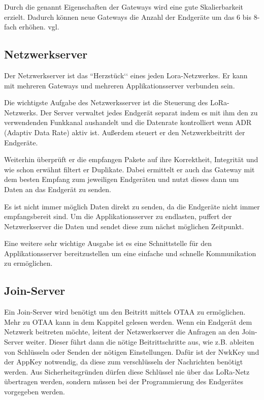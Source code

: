 \documentclass[a4paper,12pt]{article}
\begin{document}
            Durch die genannt Eigenschaften der Gateways wird eine gute Skalierbarkeit erzielt. Dadurch können neue 
            Gateways die Anzahl der Endgeräte um das 6 bis 8-fach erhöhen. vgl. \cite[S.10]{WhatIsLoRa}
        \subsection{Netzwerkserver}
            Der Netzwerkserver ist das ``Herzstück‘‘ eines jeden Lora-Netzwerkes. Er kann mit mehreren Gateways und 
            mehreren Applikationsserver verbunden sein. 

            Die wichtigste Aufgabe des Netzwerksserver ist die Steuerung des LoRa-Netzwerks. Der Server 
            verwaltet jedes Endgerät separat indem es mit ihm den zu verwendenden Funkkanal aushandelt und die Datenrate
             kontrolliert wenn ADR (Adaptiv Data Rate) aktiv ist. Außerdem steuert er den Netzwerkbeitritt der 
             Endgeräte.

            Weiterhin überprüft er die empfangen Pakete auf ihre Korrektheit, Integrität und wie schon erwähnt 
            filtert er Duplikate.
            Dabei ermittelt er auch das Gateway mit dem besten Empfang zum jeweiligen Endgeräten und nutzt 
            dieses dann um Daten an das Endgerät zu senden.

            Es ist nicht immer möglich Daten direkt zu senden, da die Endgeräte nicht immer empfangsbereit sind. Um 
            die Applikationsserver zu endlasten, puffert der Netzwerkserver die Daten und sendet diese zum nächst 
            möglichen Zeitpunkt.

            Eine weitere sehr wichtige Ausgabe ist es eine Schnittstelle für den Applikationsserver bereitzustellen 
            um eine 
            einfache und schnelle Kommunikation zu ermöglichen.
        \subsection{Join-Server}
            Ein Join-Server wird benötigt um den Beitritt mittels OTAA zu ermöglichen. Mehr zu OTAA kann in dem 
            Kappitel  gelesen werden. Wenn ein Endgerät dem Netzwerk beitreten möchte, leitent 
            der Netzwerkserver die Anfragen an den Join-Server weiter. Dieser führt dann die nötige Beitrittschritte 
            aus, wie z.B. ableiten von Schlüsseln oder Senden der nötigen Einstellungen. Dafür ist der NwkKey und 
            der AppKey notwendig, da diese zum verschlüsseln der Nachrichten benötigt werden. 
            Aus Sicherheitsgründen dürfen diese Schlüssel nie über das LoRa-Netz übertragen werden, sondern müssen
            bei der Programmierung des Endgerätes vorgegeben werden. \cite[S. 9 f.]{LoRaBack}
\end{document}
